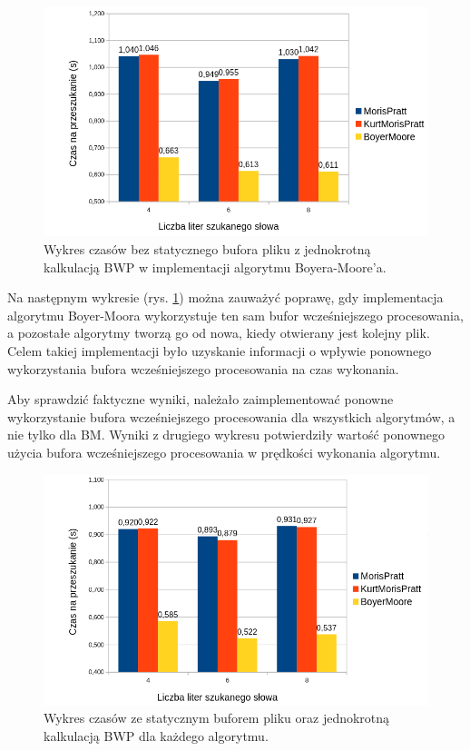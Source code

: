 \begin{figure}[htbp]
    \includegraphics[width=\textwidth]{./images/GraphPreAllocBM.png}
    \caption{Wykres czasów bez statycznego bufora pliku z jednokrotną kalkulacją
     BWP w implementacji algorytmu Boyera-Moore'a. }
    \label{fig:GraphPreAllocBM}
\end{figure}

Na następnym wykresie (rys. \ref{fig:GraphPreAllocBM}) można zauważyć poprawę, gdy
implementacja algorytmu Boyer-Moora wykorzystuje ten sam bufor wcześniejszego procesowania, \\
a pozostałe algorytmy tworzą go od nowa, kiedy otwierany jest kolejny plik. Celem 
takiej implementacji było uzyskanie informacji o wpływie ponownego wykorzystania
bufora wcześniejszego procesowania na czas wykonania. 

Aby sprawdzić faktyczne wyniki, należało zaimplementować ponowne wykorzystanie
bufora wcześniejszego procesowania dla wszystkich algorytmów, a nie tylko dla BM.
Wyniki z drugiego wykresu potwierdziły wartość ponownego użycia bufora
wcześniejszego procesowania w prędkości wykonania algorytmu.

\begin{figure}[htbp]
    \includegraphics[width=\textwidth]{./images/GraphStaticPreallocAndFileBuffer.png}
    \caption{Wykres czasów ze statycznym buforem pliku oraz jednokrotną kalkulacją BWP dla każdego algorytmu.}
    \label{fig:GraphStaticPreallocAndFileBuffer}
\end{figure}

